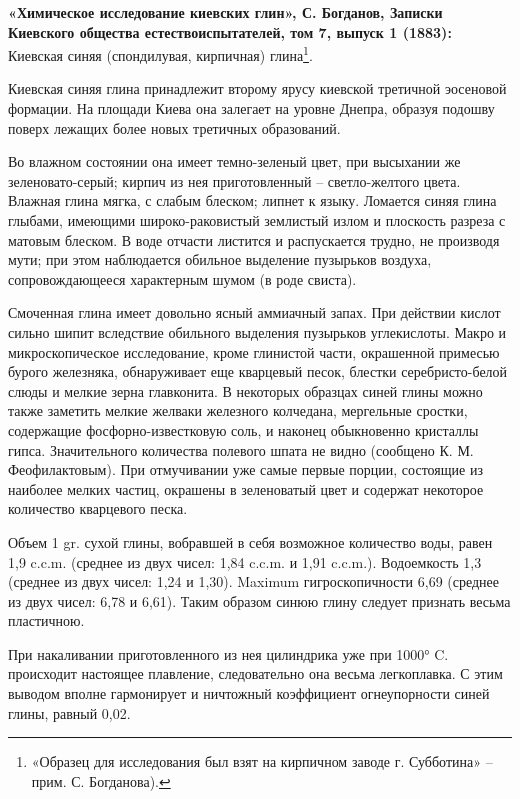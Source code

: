 \textbf{«Химическое исследование киевских глин», С. Богданов, Записки Киевского общества естествоиспытателей, том 7, выпуск 1 (1883):}\\

Киевская синяя (спондилувая, кирпичная) глина\footnote{«Образец для исследования был взят на кирпичном заводе г. Субботина» – прим. С. Богданова).}.

Киевская синяя глина принадлежит второму ярусу киевской третичной эосеновой формации. На площади Киева она залегает на уровне Днепра, образуя подошву поверх лежащих более новых третичных образований.

Во влажном состоянии она имеет темно-зеленый цвет, при высыхании же зеленовато-серый; кирпич из нея приготовленный – светло-желтого цвета. Влажная глина мягка, с слабым блеском; липнет к языку. Ломается синяя глина глыбами, имеющими широко-раковистый землистый излом и плоскость разреза с матовым блеском. В воде отчасти листится и распускается трудно, не производя мути; при этом наблюдается обильное выделение пузырьков воздуха, сопровождающееся характерным шумом (в роде свиста).

Смоченная глина имеет довольно ясный аммиачный запах. При действии кислот сильно шипит вследствие обильного выделения пузырьков углекислоты. Макро и микроскопическое исследование, кроме глинистой части, окрашенной примесью бурого железняка, обнаруживает еще кварцевый песок, блестки сере\-бристо-белой слюды и мелкие зерна главконита. В некоторых образцах синей глины можно также заметить мелкие желваки железного колчедана, мергельные сростки, содержащие фосфорно-известковую соль, и наконец обыкновенно кристаллы гипса. Значительного количества полевого шпата не видно (сообщено К. М. Феофилактовым). При отмучивании уже самые первые порции, состоящие из наиболее мелких частиц, окрашены в зеленоватый цвет и содержат некоторое количество кварцевого песка.

Объем 1 gr. сухой глины, вобравшей в себя возможное количество воды, равен 1,9 c.c.m. (среднее из двух чисел: 1,84 c.c.m. и 1,91 c.c.m.). Водоемкость 1,3 (среднее из двух чисел: 1,24 и 1,30). Maximum гигроскопичности 6,69 (среднее из двух чисел: 6,78 и 6,61). Таким образом синюю глину следует признать весьма пластичною.

При накаливании приготовленного из нея цилиндрика уже при 1000° C. происходит настоящее плавление, следовательно она весьма легкоплавка. С этим выводом вполне гармонирует и ничтожный коэффициент огнеупорности синей глины, равный 0,02.

